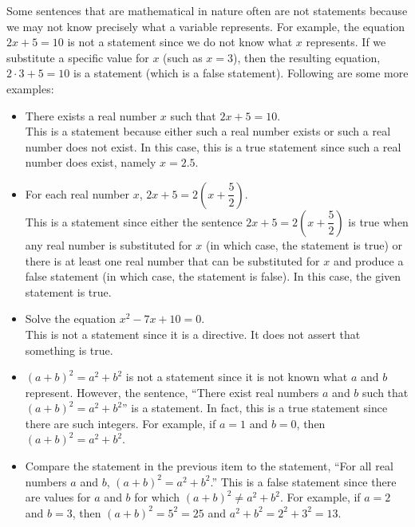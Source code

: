 Some sentences that are mathematical in nature often are not statements because we may not know precisely what a variable represents.  For example, the equation $2x + 5 = 10$ is not a statement since we do not know what $x$ represents.  If we substitute a specific value for $x$ (such as $x = 3$), then the resulting equation, $2 \cdot 3 + 5 = 10$ is a statement (which is a false statement).  Following are some more examples:
\begin{itemize}
  \item There exists a real number $x$ such that $2x + 5 = 10$. \\
This is a statement because either such a real number exists or such a real number does not exist.  In this case, this is a true statement since such a real number does exist, namely $x = 2.5$.
  \item For each real number $x$, $2x + 5 = 2\left(x + \dfrac{5}{2} \right)$.\\
This is a statement since either the sentence $2x + 5 = 2\left(x + \dfrac{5}{2} \right)$ is true when any real number is substituted for $x$ (in which case, the statement is true) or there is at least one real number that can be substituted for $x$ and produce a false statement (in which case, the statement is false).  In this case, the given statement is true.
  \item Solve the equation $x^2 - 7x + 10 = 0$. \\
This is not a statement since it is a directive.  It does not assert that something is true.
  \item $(a + b)^2 = a^2 + b^2$ is not a statement since it is not known what $a$ and $b$ represent.  However, the sentence, ``There exist real numbers $a$ and $b$ such that $(a + b)^2 = a^2 + b^2$'' is a statement.  In fact, this is a true statement since there are such integers.  For example, if $a = 1$ and $b = 0$, then 
$(a + b)^2 = a^2 + b^2$.
  \item Compare the statement in the previous item to the statement, ``For all real numbers $a$ and $b$, 
$(a + b)^2 = a^2 + b^2$.''  This is a false statement since there are values for $a$ and $b$ for which 
$(a + b)^2 \ne a^2 + b^2$.  For example, if $a = 2$ and $b = 3$, then $(a + b)^2 = 5^2 = 25$ and 
$a^2 + b^2 = 2^2 + 3^2 = 13$.
\end{itemize}


